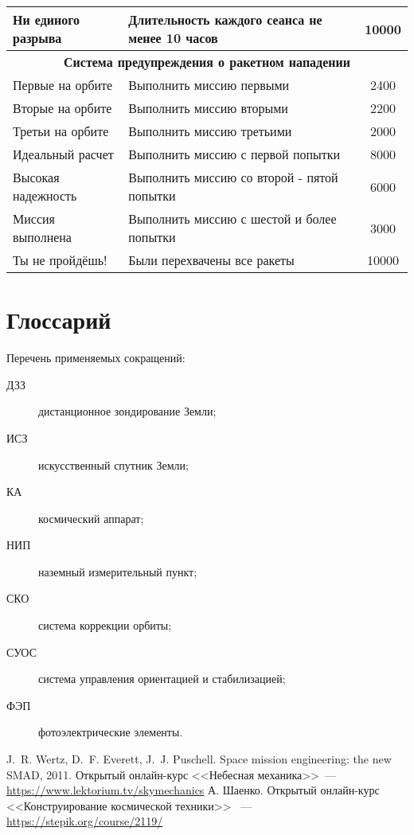 \documentclass[12pt,a4paper]{article}
\begin{document}
\begin{center}
\begin{longtable}{ |p{5cm}|p{8cm}|c|}
  \hline
  Ни единого разрыва & Длительность каждого сеанса не менее 10 часов & 10000\\
  \hline
  \multicolumn{3}{|c|}{\textbf{Система предупреждения о ракетном нападении}}\\
  \hline
  Первые на орбите & Выполнить миссию первыми & 2400\\
  \hline
  Вторые на орбите & Выполнить миссию вторыми & 2200\\
  \hline
  Третьи на орбите & Выполнить миссию третьими & 2000\\
  \hline
  Идеальный расчет & Выполнить миссию с первой попытки & 8000\\
  \hline
  Высокая надежность & Выполнить миссию со второй - пятой попытки & 6000\\
  \hline
  Миссия выполнена & Выполнить миссию с шестой и более попытки & 3000\\
  \hline
  Ты не пройдёшь! & Были перехвачены все ракеты & 10000\\
  \hline
\end{longtable}
\end{center}

\section*{Глоссарий}

Перечень применяемых сокращений:

\begin{description}
\item[ДЗЗ] дистанционное зондирование Земли;
\item[ИСЗ] искусственный спутник Земли;
\item[КА] космический аппарат;
\item[НИП] наземный измерительный пункт;
\item[СКО] система коррекции орбиты;
\item[СУОС] система управления ориентацией и стабилизацией;
\item[ФЭП] фотоэлектрические элементы.
\end{description}

\begin{thebibliography}{2}
 J.~R. Wertz, D.~F. Everett, J.~J. Puschell. Space mission
engineering: the new SMAD, 2011.
 Открытый онлайн-курс <<Небесная механика>>~---
  \url{https://www.lektorium.tv/skymechanics}
 А. Шаенко. Открытый онлайн-курс <<Конструирование космической техники>> ~---
  \url{https://stepik.org/course/2119/}
\end{thebibliography}
\end{document}
